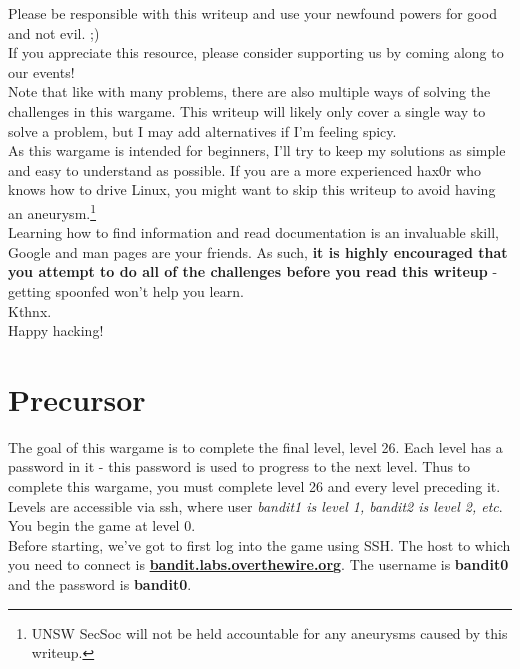 \documentclass[11pt]{article}
\begin{document}
Please be responsible with this writeup and use your newfound powers for good and not evil. ;)\\
If you appreciate this resource, please consider supporting us by coming along to our events!\\

Note that like with many problems, there are also multiple ways of solving the challenges in this wargame. This writeup
will likely only cover a single way to solve a problem, but I may add alternatives if I'm feeling spicy.\\

As this wargame is intended for beginners, I'll try to keep my solutions as simple and easy to understand as possible. If you are a more experienced hax0r who knows how to drive Linux, you might want to skip this writeup to avoid having an aneurysm.\footnote{UNSW SecSoc will not be held accountable for any aneurysms caused by this writeup.}\\

Learning how to find information and read documentation is an invaluable skill, Google and man pages are your friends.
As such, \textbf{it is highly encouraged that you attempt to do all of the challenges before you read this writeup} - getting spoonfed won't help you learn.\\
Kthnx.\\

\medskip
\noindent
Happy hacking!

\section{Precursor}
The goal of this wargame is to complete the final level, level 26. 
Each level has a password in it - this password is used to progress to the next level.
Thus to complete this wargame, you must complete level 26 and every level preceding it.\\

Levels are accessible via ssh, where user \textit{bandit1 is level 1, bandit2 is level 2, etc}.
You begin the game at level 0.\\

Before starting, we've got to first log into the game using SSH. The host to which you need to connect is \href{bandit.labs.overthewire.org}{\textbf{bandit.labs.overthewire.org}}. The username is \textbf{bandit0} and the password is \textbf{bandit0}.
\end{document}
